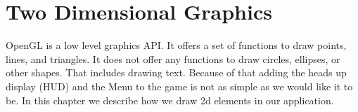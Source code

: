 \section{Two Dimensional Graphics} \label{chap:two_dimensional_graphics}
OpenGL is a low level graphics API.
It offers a set of functions to draw points, lines, and triangles.
It does not offer any functions to draw circles, ellipses, or other shapes.
That includes drawing text. 
Because of that adding the heads up display (HUD) and the Menu to the game is not as simple as we would like it to be.
In this chapter we describe how we draw 2d elements in our application.



